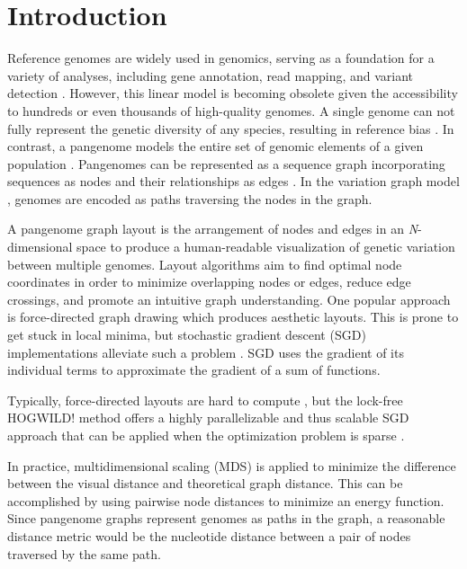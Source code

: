 \documentclass{bioinfo}
\theoremstyle{definition}
\begin{document}
	\section{Introduction}
	Reference genomes are widely used in genomics, serving as a foundation for a variety of analyses, including gene annotation, read mapping, and variant detection \citep{Singh2022}.
	However, this linear model is becoming obsolete given the accessibility to hundreds or even thousands of high-quality genomes.
	A single genome can not fully represent the genetic diversity of any species, resulting in reference bias \citep{Ballouz2019}.
	In contrast, a pangenome models the entire set of genomic elements of a given population \citep{Tettelin_2008,cpang2018,Eizenga_2020, Sherman_2020}.
	Pangenomes can be represented as a sequence graph incorporating sequences as nodes and their relationships as edges \citep{Hein1989}.
	In the variation graph model \citep{Garrison:2018}, genomes are encoded as paths traversing the nodes in the graph.
	
	A pangenome graph layout is the arrangement of nodes and edges in an \textit{N}-dimensional space to produce a human-readable visualization of genetic variation between multiple genomes.
	Layout algorithms aim to find optimal node coordinates in order to minimize overlapping nodes or edges, reduce edge crossings, and promote an intuitive graph understanding.
	One popular approach is force-directed graph drawing \citep{cheong_force-directed_2022} which produces aesthetic layouts.
	This is prone to get stuck in local minima, but stochastic gradient descent (SGD) implementations alleviate such a problem \citep{Zheng2019}.
	SGD uses the gradient of its individual terms to approximate the gradient of a sum of functions.
	
	Typically, force-directed layouts are hard to compute \citep{wang_research_2014}, but the lock-free HOGWILD! method offers a highly parallelizable and thus scalable SGD approach that can be applied when the optimization problem is sparse \citep{Recht2011}.
	
	In practice, multidimensional scaling (MDS) is applied to minimize the difference between the visual distance and theoretical graph distance.
	This can be accomplished by using pairwise node distances to minimize an energy function.
	Since pangenome graphs represent genomes as paths in the graph, a reasonable distance metric would be the nucleotide distance between a pair of nodes traversed by the same path.
	
\end{document}
